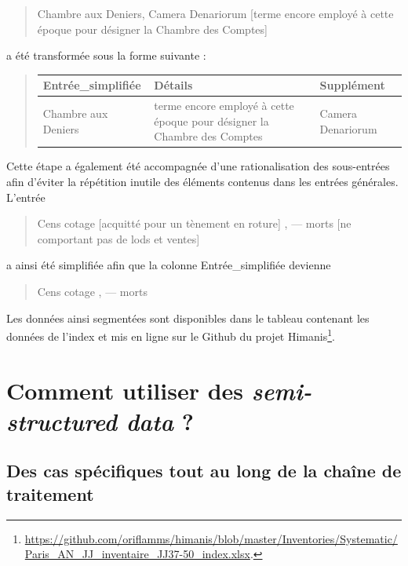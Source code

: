 \documentclass[a4paper,12pt,twoside]{book}
\begin{document}
	\begin{quotation}
		Chambre aux Deniers, Camera Denariorum [terme encore employé à cette époque pour désigner la Chambre des Comptes]
	\end{quotation}

	\noindent a été transformée sous la forme suivante :

	\begin{quotation}
		\begin{tabular}{|p{4cm}|p{4cm}|p{4cm}|}
			\hline
			Entrée\_simplifiée & Détails & Supplément \\ \hline
			Chambre aux Deniers & terme encore employé à cette époque pour désigner la Chambre des Comptes & Camera Denariorum \\ \hline
		\end{tabular}
	\end{quotation}
	
	\noindent Cette étape a également été accompagnée d'une rationalisation des sous-entrées afin d'éviter la répétition inutile des éléments contenus dans les entrées générales. L'entrée
	
	\begin{quotation}
		Cens cotage [acquitté pour un tènement en roture] , — morts [ne comportant pas de lods et ventes]
	\end{quotation}

	\noindent a ainsi été simplifiée afin que la colonne \og Entrée\_simplifiée\fg{} devienne
	
	\begin{quotation}
		Cens cotage , — morts
	\end{quotation}

	\noindent Les données ainsi segmentées sont disponibles dans le tableau contenant les données de l'index et mis en ligne sur le Github du projet Himanis\footnote{\url{https://github.com/oriflamms/himanis/blob/master/Inventories/Systematic/Paris_AN_JJ_inventaire_JJ37-50_index.xlsx}.}.
	
	\section{Comment utiliser des \textit{semi-structured data} ?}
	
	\subsection{Des cas spécifiques tout au long de la chaîne de traitement}
	
\end{document}
